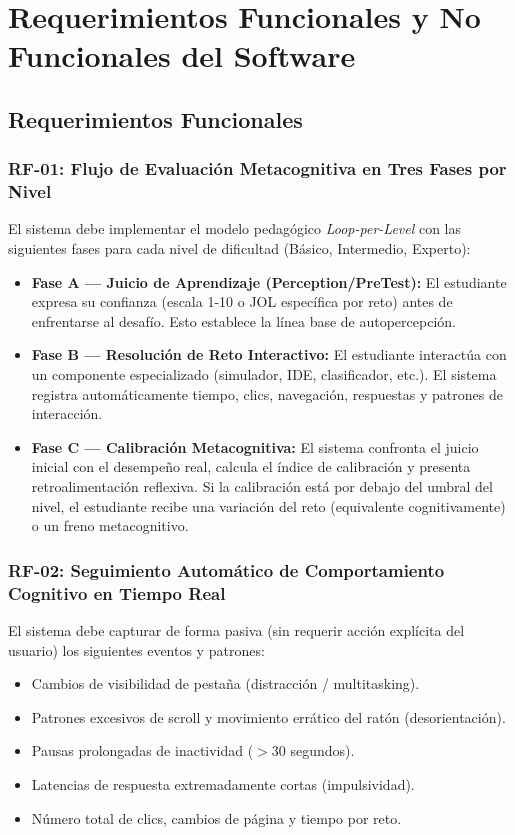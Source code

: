 \documentclass[11pt,a4paper]{article}
\begin{document}
\section{Requerimientos Funcionales y No Funcionales del Software}

\subsection{Requerimientos Funcionales}

\subsubsection{RF-01: Flujo de Evaluación Metacognitiva en Tres Fases por Nivel}

El sistema debe implementar el modelo pedagógico \textit{Loop-per-Level} con las siguientes fases para cada nivel de dificultad (Básico, Intermedio, Experto):

\begin{itemize}
    \item \textbf{Fase A --- Juicio de Aprendizaje (Perception/PreTest):} El estudiante expresa su confianza (escala 1-10 o JOL específica por reto) antes de enfrentarse al desafío. Esto establece la línea base de autopercepción.
    \item \textbf{Fase B --- Resolución de Reto Interactivo:} El estudiante interactúa con un componente especializado (simulador, IDE, clasificador, etc.). El sistema registra automáticamente tiempo, clics, navegación, respuestas y patrones de interacción.
    \item \textbf{Fase C --- Calibración Metacognitiva:} El sistema confronta el juicio inicial con el desempeño real, calcula el índice de calibración y presenta retroalimentación reflexiva. Si la calibración está por debajo del umbral del nivel, el estudiante recibe una variación del reto (equivalente cognitivamente) o un freno metacognitivo.
\end{itemize}

\subsubsection{RF-02: Seguimiento Automático de Comportamiento Cognitivo en Tiempo Real}

El sistema debe capturar de forma pasiva (sin requerir acción explícita del usuario) los siguientes eventos y patrones:

\begin{itemize}
    \item Cambios de visibilidad de pestaña (distracción / multitasking).
    \item Patrones excesivos de scroll y movimiento errático del ratón (desorientación).
    \item Pausas prolongadas de inactividad ($>30$ segundos).
    \item Latencias de respuesta extremadamente cortas (impulsividad).
    \item Número total de clics, cambios de página y tiempo por reto.
\end{itemize}
\end{document}
